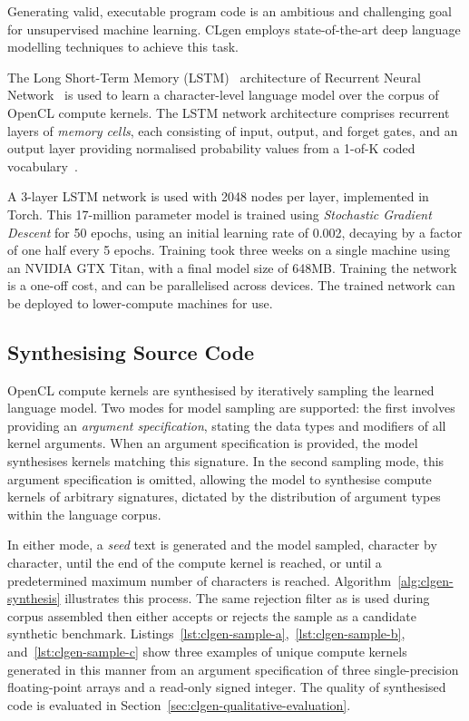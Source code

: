 Generating valid, executable program code is an ambitious and challenging goal for unsupervised machine learning. CLgen employs state-of-the-art deep language modelling techniques to achieve this task.

The Long Short-Term Memory (LSTM)~\cite{Hochreiter1997} architecture of Recurrent Neural Network~\cite{Sundermeyer2012,Mikolov2015} is used to learn a character-level language model over the corpus of OpenCL compute kernels. The LSTM network architecture comprises recurrent layers of \emph{memory cells}, each consisting of input, output, and forget gates, and an output layer providing normalised probability values from a 1-of-K coded vocabulary~\cite{Graves}.

A 3-layer LSTM network is used with 2048 nodes per layer, implemented in Torch. This 17-million parameter model is trained using \textit{Stochastic Gradient Descent} for 50 epochs, using an initial learning rate of 0.002, decaying by a factor of one half every 5 epochs. Training took three weeks on a single machine using an NVIDIA GTX Titan, with a final model size of 648MB. Training the network is a one-off cost, and can be parallelised across devices. The trained network can be deployed to lower-compute machines for use.

\subsection{Synthesising Source Code}
\label{subsec:synthesizing-opencl}

OpenCL compute kernels are synthesised by iteratively sampling the learned language model. Two modes for model sampling are supported: the first involves providing an \emph{argument specification}, stating the data types and modifiers of all kernel arguments. When an argument specification is provided, the model synthesises kernels matching this signature. In the second sampling mode, this argument specification is omitted, allowing the model to synthesise compute kernels of arbitrary signatures, dictated by the distribution of argument types within the language corpus.

In either mode, a \emph{seed} text is generated and the model sampled, character by character, until the end of the compute kernel is reached, or until a predetermined maximum number of characters is reached. Algorithm~\ref{alg:clgen-synthesis} illustrates this process. The same rejection filter as is used during corpus assembled then either accepts or rejects the sample as a candidate synthetic benchmark. Listings~\ref{lst:clgen-sample-a},~\ref{lst:clgen-sample-b}, and~\ref{lst:clgen-sample-c} show three examples of unique compute kernels generated in this manner from an argument specification of three single-precision floating-point arrays and a read-only signed integer. The quality of synthesised code is evaluated in Section~\ref{sec:clgen-qualitative-evaluation}.

